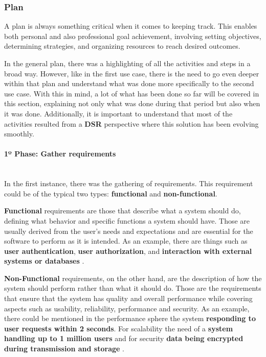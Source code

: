 \subsubsection{Plan}
A plan is always something critical when it comes to keeping track. This enables both personal and also professional goal achievement, involving setting objectives, determining strategies, and organizing resources to reach desired outcomes.

In the general plan, there was a highlighting of all the activities and steps in a broad way. However, like in the first use case, there is the need to go even deeper within that plan and understand what was done more specifically to the second use case. With this in mind, a lot of what has been done so far will be covered in this section, explaining not only what was done during that period but also when it was done. Additionally, it is important to understand that most of the activities resulted from a \textbf{DSR} perspective where this solution has been evolving smoothly.

\paragraph{1º Phase: Gather requirements}\mbox{}\\
In the first instance, there was the gathering of requirements. This requirement could be of the typical two types: \textbf{functional} and \textbf{non-functional}.

\textbf{Functional} requirements are those that describe what a system should do, defining what behavior and specific functions a system should have. Those are usually derived from the user's needs and expectations and are essential for the software to perform as it is intended. As an example, there are things such as \textbf{user authentication}, \textbf{user authorization}, and \textbf{interaction with external systems or databases} \cite{functional-requirements}.

\textbf{Non-Functional} requirements, on the other hand, are the description of how the system should perform rather than what it should do. Those are the requirements that ensure that the system has quality and overall performance while covering aspects such as usability, reliability, performance and security. As an example, there could be mentioned in the performance sphere the system \textbf{responding to user requests within 2 seconds}. For scalability the need of a \textbf{system handling up to 1 million users} and for security \textbf{data being encrypted during transmission and storage} \cite{non-functional-requirements}.

